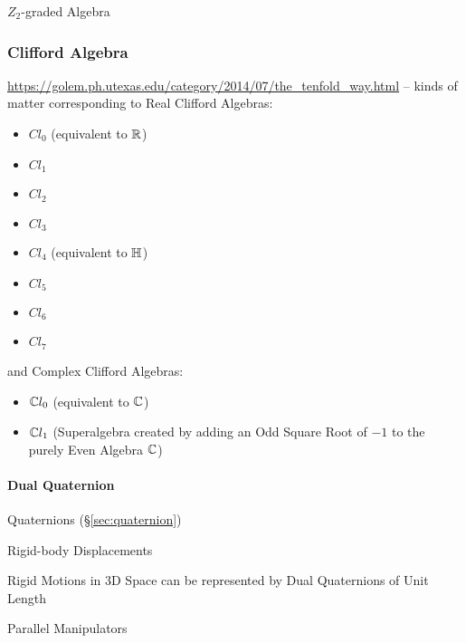 $Z_2$-graded Algebra



\subsubsection{Clifford Algebra}\label{sec:clifford_algebra}

\url{https://golem.ph.utexas.edu/category/2014/07/the_tenfold_way.html} -- kinds
of matter corresponding to Real Clifford Algebras:
\begin{itemize}
\item $Cl_0$ (equivalent to $\mathbb{R}$)
\item $Cl_1$
\item $Cl_2$
\item $Cl_3$
\item $Cl_4$ (equivalent to $\mathbb{H}$)
\item $Cl_5$
\item $Cl_6$
\item $Cl_7$
\end{itemize}
and Complex Clifford Algebras:
\begin{itemize}
\item $\mathbb{C}{l}_0$ (equivalent to $\mathbb{C}$)
\item $\mathbb{C}{l}_1$ (Superalgebra created by adding an Odd Square Root of $-1$
  to the purely Even Algebra $\mathbb{C}$)
\end{itemize}



\paragraph{Dual Quaternion}\label{sec:dual_quaternion}\hfill

\fist Quaternions (\S\ref{sec:quaternion})

Rigid-body Displacements

Rigid Motions in 3D Space can be represented by Dual Quaternions of Unit Length

Parallel Manipulators
